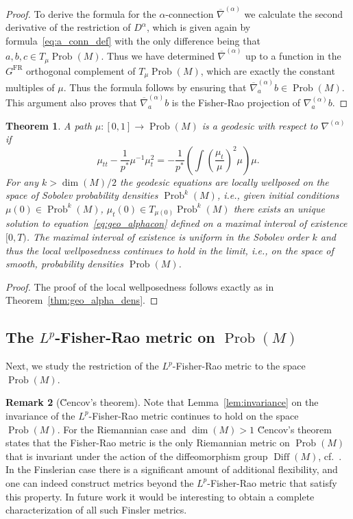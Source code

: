 \documentclass[11pt]{amsart}
\newtheorem{theorem}{Theorem}[section]
\theoremstyle{definition}
\newtheorem{remark}[theorem]{Remark}
\newcommand{\Prob}{\operatorname{Prob}(M)}
\newcommand{\Probk}{\operatorname{Prob}^k(M)}
\newcommand{\Diff}{\operatorname{Diff}(M)}
\newcommand{\GFR}{G^{\mathrm{FR}}}
\newcommand{\nablabar}{\overline{\nabla}}
\begin{document}
\begin{proof}
To derive the formula for the $\alpha$-connection $\nablabar^{(\alpha)}$ we calculate the second derivative of the restriction of $D^{\alpha}$, which is given again by formula~\eqref{eq:a_conn_def} with the only difference being that $a,b,c\in T_\mu\Prob$. Thus we have determined $\nablabar^{(\alpha)}$ up to a function in the $\GFR$ orthogonal complement of $T_\mu\Prob$, which are exactly the constant multiples of $\mu$. Thus the formula follows by ensuring that  $\nablabar^{(\alpha)}_a b\in \Prob$. 
This argument also proves that  $\nablabar^{(\alpha)}_a b$ is the Fisher-Rao projection of $\nabla^{(\alpha)}_a b$.  
\end{proof}
\begin{theorem}\label{eq:alpha_conn_geo_Prob}
A path $\mu:[0,1]\to \Prob$ is a geodesic with respect to $\nabla^{(\alpha)}$ if
\[
\mu_{tt} - \frac{1}{p^*} \mu^{-1}\mu_t^2
=
- \frac{1}{p^*} \left(\int \left(\frac{\mu_t}{\mu}\right)^{2}\mu\right) \mu.
\]
For any $k>\operatorname{dim}(M)/2$ the geodesic equations are locally wellposed on the space of Sobolev probability densities $\Probk$, i.e., given initial conditions $\mu(0)\in \Probk$, $\mu_t(0)\in T_{\mu(0)}\Probk$ there exists an unique solution to equation~\eqref{eq:geo_alphacon} defined on a maximal interval of existence $[0,T)$. 
The maximal interval of existence is uniform in the Sobolev order $k$ and thus the local wellposedness continues to hold in the limit, i.e., on the space of smooth, probability densities $\Prob$.
\end{theorem}
\begin{proof}
The proof of the local wellposedness follows exactly as in Theorem~\ref{thm:geo_alpha_dens}.     
\end{proof}

\subsection{The $L^p$-Fisher-Rao metric on $\Prob$}
Next, we study the restriction of the $L^p$-Fisher-Rao metric to the space $\Prob$.
\begin{remark}[\u{C}encov's theorem]\label{rem:uniqueness}
Note that Lemma~\ref{lem:invariance} on the invariance of the $L^p$-Fisher-Rao metric continues to hold on the space $\Prob$. For the Riemannian case and $\operatorname{dim}(M)>1$ \u{C}encov's theorem states that the Fisher-Rao metric is the only Riemannian metric on $\Prob$ that is invariant under the action of the diffeomorphism group $\Diff$, cf.~\cite{cencov2000statistical,ay2015information,bauer2016uniqueness}. In the Finslerian case there is a significant amount of additional flexibility, and one can indeed construct metrics beyond the $L^p$-Fisher-Rao metric that satisfy this property. In future work it would be interesting to obtain a complete characterization of all such Finsler metrics. 
\end{remark}
\end{document}
